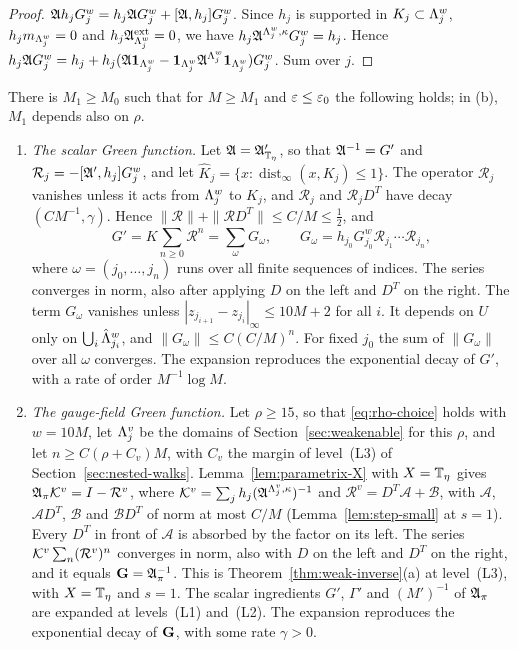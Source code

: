 \begin{proof}
$\mathfrak A h_jG^w_j=h_j\mathfrak A G^w_j+[\mathfrak A,h_j]G^w_j$. Since $h_j$ is supported in $K_j\subset\Lambda^w_j$, $h_jm_{\Lambda^w_j}=0$ and $h_j\mathfrak A^{\rm ext}_{\Lambda^w_j}=0$, we have $h_j\mathfrak A^{\Lambda^w_j,\kappa}G^w_j=h_j$. Hence $h_j\mathfrak A G^w_j=h_j+h_j(\mathfrak A\mathbf 1_{\Lambda^w_j}-\mathbf 1_{\Lambda^w_j}\mathfrak A^{\Lambda^w_j}\mathbf 1_{\Lambda^w_j})G^w_j$. Sum over $j$.
\end{proof}

\begin{theorem}\label{thm:random-walk}
There is $M_1\ge M_0$ such that for $M\ge M_1$ and $\varepsilon\le\varepsilon_0$ the following holds; in (b), $M_1$ depends also on $\rho$.
\begin{enumerate}[label=(\alph*)]
\item \emph{The scalar Green function.} Let $\mathfrak A=\mathfrak A'_{\mathbb T_\eta}$, so that $\mathfrak A^{-1}=G'$ and $\mathcal R_j=-[\mathfrak A',h_j]G^w_j$, and let $\hat K_j=\{x:\operatorname{dist}_\infty(x,K_j)\le1\}$. The operator $\mathcal R_j$ vanishes unless it acts from $\Lambda^w_j$ to $\hat K_j$, and $\mathcal R_j$ and $\mathcal R_jD^T$ have decay $(CM^{-1},\gamma)$. Hence $\|\mathcal R\|+\|\mathcal RD^T\|\le C/M\le\frac12$, and
\[
G'=K\sum_{n\ge0}\mathcal R^n=\sum_{\omega}G_\omega,\qquad G_\omega=h_{j_0}G^w_{j_0}\mathcal R_{j_1}\cdots\mathcal R_{j_n},
\]
where $\omega=(j_0,\dots,j_n)$ runs over all finite sequences of indices. The series converges in norm, also after applying $D$ on the left and $D^T$ on the right. The term $G_\omega$ vanishes unless $|z_{j_{i+1}}-z_{j_i}|_\infty\le10M+2$ for all $i$. It depends on $U$ only on $\bigcup_i\hat{\Lambda}^w_{j_i}$, and $\|G_\omega\|\le C(C/M)^n$. For fixed $j_0$ the sum of $\|G_\omega\|$ over all $\omega$ converges. The expansion reproduces the exponential decay of $G'$, with a rate of order $M^{-1}\log M$.
\item \emph{The gauge-field Green function.} Let $\rho\ge15$, so that \eqref{eq:rho-choice} holds with $w=10M$, let $\Lambda^v_j$ be the domains of Section~\ref{sec:weakenable} for this $\rho$, and let $n\ge C(\rho+C_v)M$, with $C_v$ the margin of level~(L3) of Section~\ref{sec:nested-walks}. Lemma~\ref{lem:parametrix-X} with $X=\mathbb T_\eta$ gives $\mathfrak A_\pi \mathcal K^v=I-\mathcal R^v$, where $\mathcal K^v=\sum_jh_j(\mathfrak A^{\Lambda^v_j,\kappa})^{-1}$ and $\mathcal R^v=D^T\mathcal A+\mathcal B$, with $\mathcal A$, $\mathcal AD^T$, $\mathcal B$ and $\mathcal BD^T$ of norm at most $C/M$ (Lemma~\ref{lem:step-small} at $s=1$). Every $D^T$ in front of $\mathcal A$ is absorbed by the factor on its left. The series $\mathcal K^v\sum_n(\mathcal R^v)^n$ converges in norm, also with $D$ on the left and $D^T$ on the right, and it equals $\mathbf G=\mathfrak A_\pi^{-1}$. This is Theorem~\ref{thm:weak-inverse}(a) at level~(L3), with $X=\mathbb T_\eta$ and $s=1$. The scalar ingredients $G'$, $\Gamma'$ and $(M')^{-1}$ of $\mathfrak A_\pi$ are expanded at levels~(L1) and~(L2). The expansion reproduces the exponential decay of $\mathbf G$, with some rate $\gamma>0$.
\end{enumerate}
\end{theorem}

